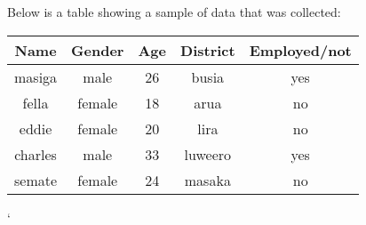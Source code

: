 \documentclass[a4paper,12pt]{article}
\begin{document}
Below is a table showing a sample of data that was collected:

\begin{center}
\begin{tabular}{|c|c|c|c|c|}
\hline
Name & Gender & Age & District & Employed/not  \\ [0.5ex]
\hline
masiga & male & 26 & busia & yes  \\ [0.5ex]
\hline
fella & female & 18 & arua & no  \\ [0.5ex]
\hline
eddie & female & 20 & lira & no  \\ [0.5ex]
\hline
charles & male & 33 & luweero & yes  \\ [0.5ex]
\hline
semate & female & 24 & masaka & no  \\ [0.5ex]
\hline
\end{tabular}
\end{center}`
\end{document}
